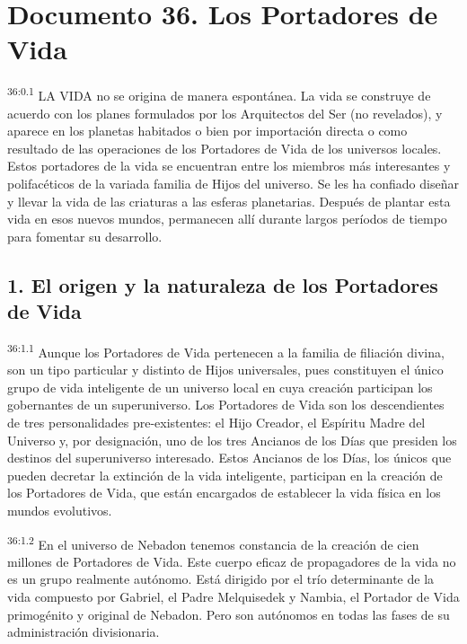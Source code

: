 \chapter{Documento 36. Los Portadores de Vida}
\par
\textsuperscript{36:0.1} LA VIDA no se origina de manera espontánea. La vida se construye de acuerdo con los planes formulados por los Arquitectos del Ser (no revelados), y aparece en los planetas habitados o bien por importación directa o como resultado de las operaciones de los Portadores de Vida de los universos locales. Estos portadores de la vida se encuentran entre los miembros más interesantes y polifacéticos de la variada familia de Hijos del universo. Se les ha confiado diseñar y llevar la vida de las criaturas a las esferas planetarias. Después de plantar esta vida en esos nuevos mundos, permanecen allí durante largos períodos de tiempo para fomentar su desarrollo.

\section*{1. El origen y la naturaleza de los Portadores de Vida}
\par
\textsuperscript{36:1.1} Aunque los Portadores de Vida pertenecen a la familia de filiación divina, son un tipo particular y distinto de Hijos universales, pues constituyen el único grupo de vida inteligente de un universo local en cuya creación participan los gobernantes de un superuniverso. Los Portadores de Vida son los descendientes de tres personalidades pre-existentes: el Hijo Creador, el Espíritu Madre del Universo y, por designación, uno de los tres Ancianos de los Días que presiden los destinos del superuniverso interesado. Estos Ancianos de los Días, los únicos que pueden decretar la extinción de la vida inteligente, participan en la creación de los Portadores de Vida, que están encargados de establecer la vida física en los mundos evolutivos.

\par
\textsuperscript{36:1.2} En el universo de Nebadon tenemos constancia de la creación de cien millones de Portadores de Vida. Este cuerpo eficaz de propagadores de la vida no es un grupo realmente autónomo. Está dirigido por el trío determinante de la vida compuesto por Gabriel, el Padre Melquisedek y Nambia, el Portador de Vida primogénito y original de Nebadon. Pero son autónomos en todas las fases de su administración divisionaria.

